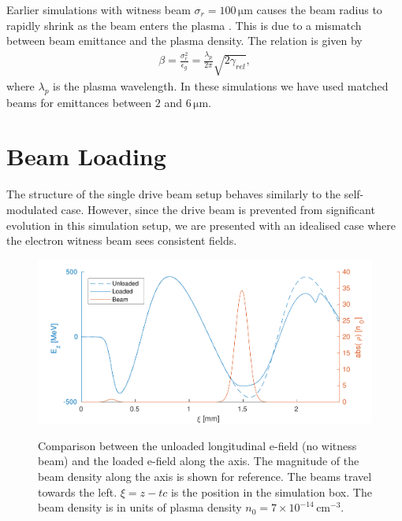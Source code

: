 \documentclass[aps,prstab,reprint,amsmath,amssymb,groupedaddress]{revtex4-1}
\newcommand{\unit}[1]{\,\mathrm{#1}}
\newcommand{\nexp}[1]{\times 10^{#1}}
\begin{document}
Earlier simulations with witness beam $\sigma_{r} = 100\unit{\mu m}$ causes the beam radius to rapidly shrink as the
beam enters the plasma \cite{berglyd_olsen:2016}. This is due to a mismatch between beam emittance and the plasma
density. The relation is given by
\begin{align}
    \beta = \frac{\sigma_r^2}{\epsilon_g} = \frac{\lambda_p}{2\pi}\sqrt{2\gamma_{rel}}, \label{EQ:Matched}
\end{align}
where $\lambda_{p}$ is the plasma wavelength. In these simulations we have used matched beams for emittances between
$2$ and $6\unit{\mu m}$.

\section[\label{S:BL}]{Beam Loading}



The structure of the single drive beam setup behaves similarly to the self-modulated case. However, since the drive
beam is prevented from significant evolution in this simulation setup, we are presented with an idealised case where
the electron witness beam sees consistent fields.

\begin{figure}
    \includegraphics[width=0.99\linewidth,trim={4mm 0mm 4mm 0mm},clip]{figures/beamLoading}
    \label{Fig:BeamLoading}
    \caption{Comparison between the unloaded longitudinal e-field (no witness beam) and the loaded e-field along the
        axis. The magnitude of the beam density along the axis is shown for reference. The beams travel towards the
        left. $\xi = z - tc$ is the position in the simulation box. The beam density is in units of plasma density
        $n_{0} = 7\nexp{-14}\unit{cm}^{-3}$.}
\end{figure}
\end{document}

